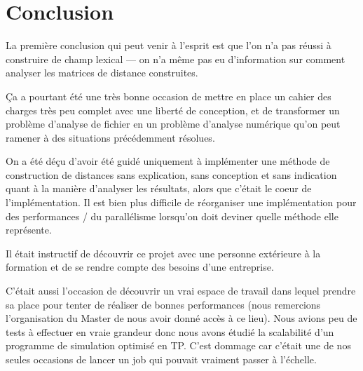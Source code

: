 \section{Conclusion}

La première conclusion qui peut venir à l'esprit est que
l'on n'a pas réussi à construire de champ lexical \----
on n'a même pas eu d'information sur comment analyser
les matrices de distance construites.

Ça a pourtant été une très bonne occasion de
mettre en place un cahier des charges très peu complet
avec une liberté de conception, et de transformer un
problème d'analyse de fichier en un problème d'analyse numérique
qu'on peut ramener à des situations précédemment résolues.

On a été déçu d'avoir été guidé uniquement à implémenter
une méthode de construction de distances sans explication,
sans conception et sans indication quant à la manière
d'analyser les résultats, alors que c'était le coeur
de l'implémentation. Il est bien plus difficile de réorganiser
une implémentation pour des performances / du parallélisme
lorsqu'on doit deviner quelle méthode elle représente.

Il était instructif de découvrir ce projet avec une personne
extérieure à la formation et de se rendre compte des besoins
d'une entreprise.

C'était aussi l'occasion de découvrir un vrai espace
de travail dans lequel prendre sa place pour tenter de
réaliser de bonnes performances
(nous remercions l'organisation du Master de nous avoir donné
accès à ce lieu).
Nous avions peu de tests à effectuer en vraie grandeur
donc nous avons étudié la scalabilité d'un programme
de simulation optimisé en TP.
C'est dommage car c'était une de nos seules occasions
de lancer un job qui pouvait vraiment passer à l'échelle.
